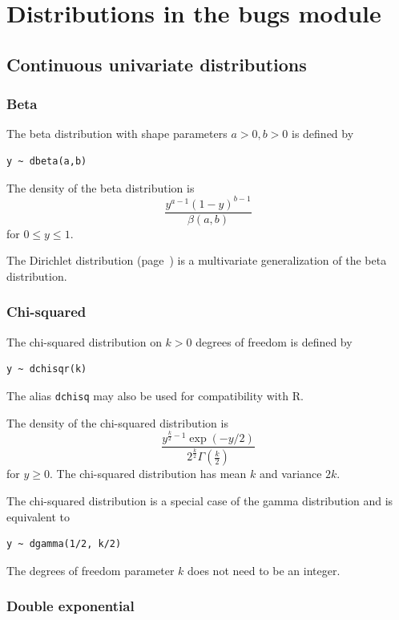\documentclass[11pt, a4paper, titlepage]{report}
\begin{document}
\section{Distributions in the bugs module}
\label{section:bugs:distributions}

\subsection{Continuous univariate distributions}

\subsubsection{Beta}
\label{bugs:dbeta}

The beta distribution with shape parameters $a > 0, b > 0$ is defined by
\begin{verbatim}
y ~ dbeta(a,b)
\end{verbatim}
The density of the beta distribution is
\[
\frac{\textstyle y^{a-1}(1-y)^{b-1}}{\textstyle \beta(a,b)}
\]
for $0 \leq y \leq 1$.

The Dirichlet distribution (page~\pageref{bugs:ddirch}) is a
multivariate generalization of the beta distribution.

\subsubsection{Chi-squared}
\label{bugs:dchisqr}

The chi-squared distribution on $k > 0$ degrees of freedom is defined by
\begin{verbatim}
y ~ dchisqr(k)
\end{verbatim}
The alias \texttt{dchisq} may also be used for compatibility with R.

The density of the chi-squared distribution is
\[
\frac{\textstyle y^{\frac{k}{2} - 1} \exp(-y/2)}
     {\textstyle 2^{\frac{k}{2}} \Gamma({\scriptstyle \frac{k}{2}})}
\]
for $y \geq 0$. The chi-squared distribution has mean $k$ and variance $2k$.

The chi-squared distribution is a special case of the gamma
distribution and is equivalent to
\begin{verbatim}
y ~ dgamma(1/2, k/2)
\end{verbatim}
The degrees of freedom parameter $k$ does not need to be an integer.

\subsubsection{Double exponential}
\label{bugs:ddexp}
\end{document}
